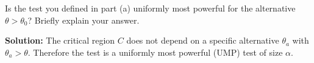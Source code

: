Is the test you defined in part (a) uniformly most powerful for the alternative $\theta > \theta_0$?
    Briefly explain your answer.

    \nl \textbf{Solution: } The critical region $C$ does not depend on a specific alternative $\theta_a$ with $\theta_a > \theta$. Therefore the test is a uniformly most powerful (UMP) test of size $\alpha$. 
